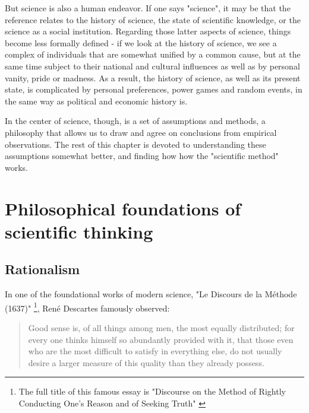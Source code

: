 \documentclass{tufte-book}
\begin{document}

But science is also a human endeavor. If one says "science", it may be that the reference relates to the history of science, the state of scientific knowledge, or the science as a social institution. Regarding those latter aspects of science, things become less formally defined - if we look at the history of science, we see a complex of individuals that are somewhat unified by a common cause, but at the same time subject to their national and cultural influences as well as by personal vanity, pride or madness. As a result, the history of science, as well as its present state, is complicated by personal preferences, power games and random events, in the same way as political and economic history is.

In the center of science, though, is a set of assumptions and methods, a philosophy that allows us to draw and agree on conclusions from empirical observations. The rest of this chapter is devoted to understanding these assumptions somewhat better, and finding how how the "scientific method" works. 


\section{Philosophical foundations of scientific thinking}



\subsection{Rationalism}


In one of the foundational works of modern science, "Le Discours de la Méthode (1637)"  \footnote{The full title of this famous essay is "Discourse on the Method of Rightly Conducting One's Reason and of Seeking Truth" \citep{Descartes-DiscourseMethodRightly-1673}}, René Descartes famously observed: 

\begin{quote}
Good sense is, of all things among men, the most equally distributed; for every one thinks himself so abundantly provided with it, that those even who are the most difficult to satisfy in everything else, do not usually desire a larger measure of this quality than they already possess.
\end{quote}
\end{document}
